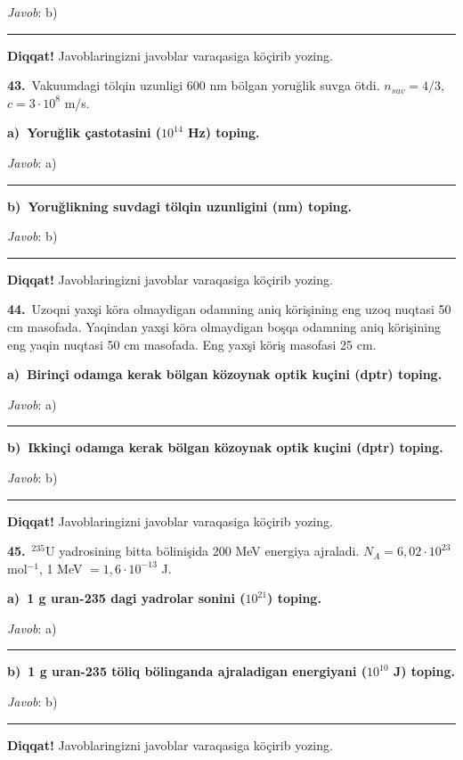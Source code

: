 \documentclass[11pt,a4paper]{article}
\newcommand{\blank}{\rule{5cm}{0.4pt}}
\begin{document}
\noindent\textit{Javob}: b)\ \blank\par
\medskip\noindent\textbf{Diqqat!} Javoblaringizni javoblar varaqasiga köçirib yozing.\par\vspace{10pt}
\noindent\textbf{43.}\ Vakuumdagi tölqin uzunligi 600 nm bölgan yoruğlik suvga ötdi. $n_{suv}=4/3$, $c=3\cdot10^8$ m/s.\par\smallskip
\medskip\noindent\textbf{a)\ Yoruğlik çastotasini ($10^{14}$ Hz) toping.}\par
\noindent\textit{Javob}: a)\ \blank\par
\medskip\noindent\textbf{b)\ Yoruğlikning suvdagi tölqin uzunligini (nm) toping.}\par
\noindent\textit{Javob}: b)\ \blank\par
\medskip\noindent\textbf{Diqqat!} Javoblaringizni javoblar varaqasiga köçirib yozing.\par\vspace{10pt}
\noindent\textbf{44.}\ Uzoqni yaxşi köra olmaydigan odamning aniq körişining eng uzoq nuqtasi 50 cm masofada. Yaqindan yaxşi köra olmaydigan boşqa odamning aniq körişining eng yaqin nuqtasi 50 cm masofada. Eng yaxşi köriş masofasi 25 cm.\par\smallskip
\medskip\noindent\textbf{a)\ Birinçi odamga kerak bölgan közoynak optik kuçini (dptr) toping.}\par
\noindent\textit{Javob}: a)\ \blank\par
\medskip\noindent\textbf{b)\ Ikkinçi odamga kerak bölgan közoynak optik kuçini (dptr) toping.}\par
\noindent\textit{Javob}: b)\ \blank\par
\medskip\noindent\textbf{Diqqat!} Javoblaringizni javoblar varaqasiga köçirib yozing.\par\vspace{10pt}
\noindent\textbf{45.}\ $^{235}$U yadrosining bitta bölinişida 200 MeV energiya ajraladi. $N_A=6{,}02\cdot10^{23}$ mol$^{-1}$, 1 MeV $=1{,}6\cdot10^{-13}$ J.\par\smallskip
\medskip\noindent\textbf{a)\ 1 g uran-235 dagi yadrolar sonini ($10^{21}$) toping.}\par
\noindent\textit{Javob}: a)\ \blank\par
\medskip\noindent\textbf{b)\ 1 g uran-235 töliq bölinganda ajraladigan energiyani ($10^{10}$ J) toping.}\par
\noindent\textit{Javob}: b)\ \blank\par
\medskip\noindent\textbf{Diqqat!} Javoblaringizni javoblar varaqasiga köçirib yozing.\par\vspace{10pt}
\end{document}
